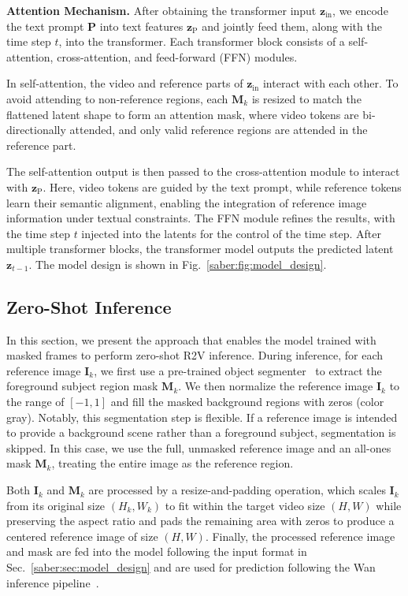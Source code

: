 \noindent \textbf{Attention Mechanism.}
After obtaining the transformer input $\mathbf{z}_\text{in}$, we encode the text prompt $\mathbf{P}$ into text features $\mathbf{z}_\text{P}$ and jointly feed them, along with the time step $t$, into the transformer.
Each transformer block consists of a self-attention, cross-attention, and feed-forward (FFN) modules.

In self-attention, the video and reference parts of $\mathbf{z}_\text{in}$ interact with each other.
To avoid attending to non-reference regions, each $\mathbf{M}_{k}$ is resized to match the flattened latent shape to form an attention mask, where video tokens are bi-directionally attended, and only valid reference regions are attended in the reference part.

The self-attention output is then passed to the cross-attention module to interact with $\mathbf{z}_\text{P}$.
Here, video tokens are guided by the text prompt, while reference tokens learn their semantic alignment, enabling the integration of reference image information under textual constraints.
The FFN module refines the results, with the time step $t$ injected into the latents for the control of the time step.
After multiple transformer blocks, the transformer model outputs the predicted latent $\mathbf{z}_{t-1}$.
The model design is shown in Fig.~\ref{saber:fig:model_design}.




\subsection{Zero-Shot Inference}
\label{saber:sec:inference}

In this section, we present the approach that enables the model trained with masked frames to perform zero-shot R2V inference.
During inference, for each reference image $\mathbf{I}_{k}$, we first use a pre-trained object segmenter~\citep{ren2024grounded, zheng2024bilateral} to extract the foreground subject region mask $\mathbf{M}_{k}$.
We then normalize the reference image $\mathbf{I}_{k}$ to the range of $[-1, 1]$ and fill the masked background regions with zeros (color gray).
Notably, this segmentation step is flexible.
If a reference image is intended to provide a background scene rather than a foreground subject, segmentation is skipped.
In this case, we use the full, unmasked reference image and an all-ones mask $\mathbf{M}_{k}$, treating the entire image as the reference region.

Both $\mathbf{I}_{k}$ and $\mathbf{M}_{k}$ are processed by a resize-and-padding operation, which scales $\mathbf{I}_{k}$ from its original size $(H_{k}, W_{k})$ to fit within the target video size $(H, W)$ while preserving the aspect ratio and pads the remaining area with zeros to produce a centered reference image of size $(H, W)$.
Finally, the processed reference image and mask are fed into the model following the input format in Sec.~\ref{saber:sec:model_design} and are used for prediction following the Wan inference pipeline~\citep{wan2025wan}.
